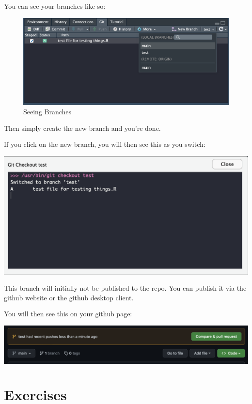 \documentclass[
  letterpaper,
  DIV=11,
  numbers=noendperiod]{scrartcl}
\begin{document}
You can see your branches like so:

\begin{figure}

{\centering \includegraphics{figures/24.png}

}

\caption{Seeing Branches}

\end{figure}

Then simply create the new branch and you're done.

If you click on the new branch, you will then see this as you switch:

\includegraphics{figures/25.png}

This branch will initially not be published to the repo. You can publish
it via the github website or the github desktop client.

You will then see this on your github page:

\includegraphics{figures/26.png}

\hypertarget{exercises}{%
\section{Exercises}\label{exercises}}
\end{document}
